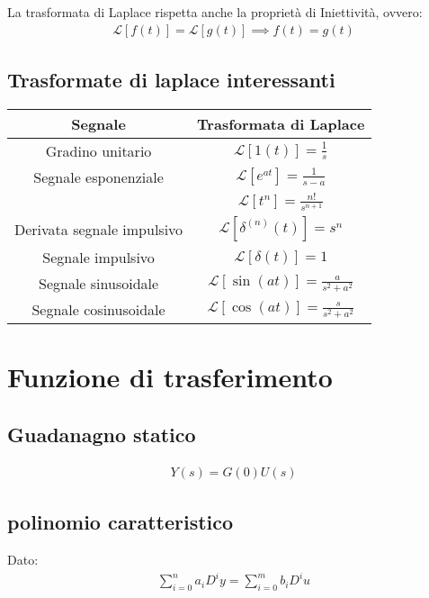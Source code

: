 \documentclass{article}
\begin{document}
La trasformata di Laplace rispetta anche la proprietà di Iniettività, ovvero:
\begin{align}
  \mathcal{L}[f(t)] = \mathcal{L}[g(t)] \implies f(t) = g(t)
\end{align}

\renewcommand{\arraystretch}{1.5} %
\subsection{Trasformate di laplace interessanti}
\begin{center}
  
\begin{tabular}{| c | c |}
  \hline
  Segnale & Trasformata di Laplace \\
  \hline
  Gradino unitario & $\mathcal{L}[1(t)] = \frac{1}{s}$ \\
  \hline
  Segnale esponenziale & $\mathcal{L}[e^{at}] = \frac{1}{s-a}$ \\
  \hline
  & $\mathcal{L}[t^n] = \frac{n!}{s^{n+1}}$ \\
  \hline
  Derivata segnale impulsivo & $\mathcal{L}[\delta^{(n)}(t)] = s^n$ \\
  \hline
  Segnale impulsivo & $\mathcal{L}[\delta(t)] = 1$ \\
  \hline
  Segnale sinusoidale & $\mathcal{L}[\sin(a t)] = \frac{a}{s^2 + a^2}$ \\
  \hline
  Segnale cosinusoidale & $\mathcal{L}[\cos(a t)] = \frac{s}{s^2 + a^2}$ \\
  \hline
\end{tabular}
\end{center}

\section{Funzione di trasferimento}
\subsection{Guadanagno statico}
\begin{align}
  Y(s) = G(0) U(s)
\end{align}

\subsection{polinomio caratteristico}
Dato:
\begin{align}
  \sum_{i=0}^n a_i D^i y = \sum_{i=0}^m b_i D^i u
\end{align}
\end{document}
